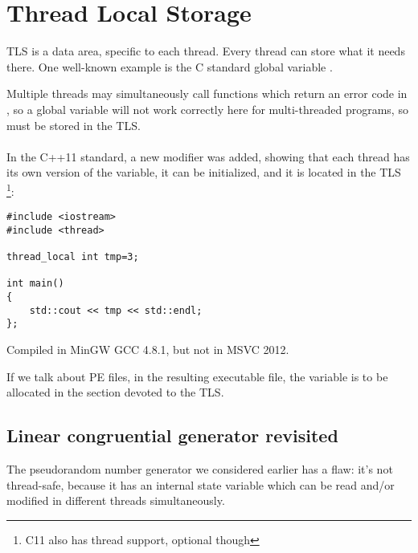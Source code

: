 \section{Thread Local Storage}
\label{TLS}

TLS is a data area, specific to each thread. Every thread can store what it needs there.
One well-known example is the C standard global variable . 

Multiple threads may simultaneously call functions
which return an error code in , so a global variable will not work correctly here for multi-threaded programs,
so  must be stored in the \ac{TLS}. \\
\\
In the C++11 standard, a new  modifier was added, showing that each thread has its own version of the variable,
it can be initialized, and it is located in the \ac{TLS}
\footnote{ C11 also has thread support, optional though}:

\begin{lstlisting}[caption=C++11,style=customc]
#include <iostream>
#include <thread>

thread_local int tmp=3;

int main()
{
	std::cout << tmp << std::endl;
};
\end{lstlisting}

Compiled in MinGW GCC 4.8.1, but not in MSVC 2012.

If we talk about PE files, in the resulting executable file, the  
variable is to be allocated in the section devoted to the \ac{TLS}.

\subsection{Linear congruential generator revisited}
\label{LCG_TLS}

The pseudorandom number generator we considered earlier  has a flaw:
it's not thread-safe, because it has an internal state variable which can be read and/or modified in different threads simultaneously.




